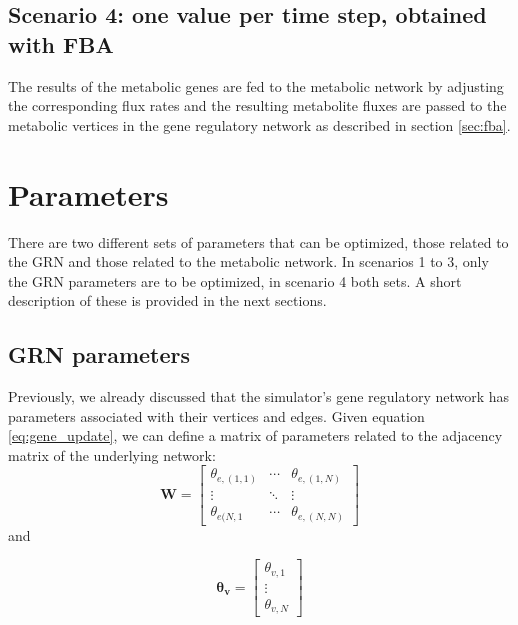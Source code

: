 \subsection{Scenario 4: one value per time step, obtained with FBA}
The results of the metabolic genes are fed to the metabolic network by adjusting the corresponding flux rates and the resulting metabolite fluxes are passed to the metabolic vertices in the gene regulatory network
as described in section \ref{sec:fba}.
\section{Parameters}\label{sec:params}
There are two different sets of parameters that can be optimized, those related to the GRN and those related to the metabolic network. In scenarios 1 to 3, only the GRN parameters are to be optimized, in scenario 4 
both sets. A short description of these is provided in the next sections.
\subsection{GRN parameters}
Previously, we already discussed that the simulator's gene regulatory network has parameters associated with their vertices and edges.
Given equation \ref{eq:gene_update}, we can define a matrix of parameters related to the adjacency matrix of the underlying network:
\begin{equation}
\mathbf{W} = \begin{bmatrix} 
\theta_{e,(1,1)} &\cdots & \theta_{e,(1,N)}\\
\vdots & \ddots & \vdots \\
\theta_{e(N,1} & \cdots & \theta_{e,(N,N)} 
      \end{bmatrix}
\end{equation}
and

\begin{equation}
 \boldsymbol{\theta_v} = \begin{bmatrix}
     \theta_{v,1} \\
      \vdots \\
      \theta_{v,N} 
     \end{bmatrix}
\end{equation}

